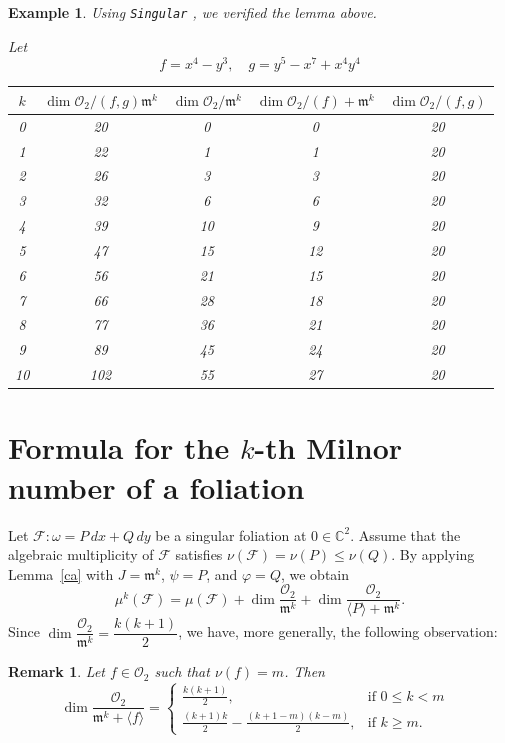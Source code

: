 \documentclass[12pt,letterpaper]{amsart}
\newcommand{\C}{\mathbb{C}}
\newcommand{\F}{\mathcal{F}}
\newcommand{\m}{\mathfrak{m}}
\newtheorem{example}{Example}[section]
\newtheorem{remark}{Remark}[section]
\begin{document}
\begin{example}
Using \texttt{Singular} \cite{Singular}, we verified the lemma above.

Let   
\[
f = x^4 - y^3, \quad g = y^5 - x^7 + x^4y^4
\]

\begin{center}
\renewcommand{\arraystretch}{1.2}
\begin{tabular}{|c|c|c|c|c|}
\toprule
$k$ & $\dim \mathcal{O}_2 / (f,g) \mathfrak{m}^k$ 
& $\dim \mathcal{O}_2 / \mathfrak{m}^k$ 
& $\dim \mathcal{O}_2 / (f)+\mathfrak{m}^k$ 
& $\dim \mathcal{O}_2 / (f,g)$ \\
\midrule
0  & 20  & 0  & 0   & 20 \\
1  & 22  & 1  & 1    & 20 \\
2  & 26  & 3  & 3    & 20 \\
3  & 32  & 6  & 6    & 20 \\
4  & 39  & 10 & 9   & 20 \\
5  & 47  & 15 & 12 & 20 \\
6  & 56  & 21 & 15  & 20 \\
7  & 66  & 28 & 18  & 20 \\
8  & 77  & 36 & 21  & 20 \\
9  & 89  & 45 & 24  & 20 \\
10 & 102 & 55 & 27  & 20 \\
\bottomrule
\end{tabular}
\end{center}
\end{example}


\section{Formula for the $k$-th Milnor number of a foliation}\label{fomula_Milnor}

Let $\F : \omega = P\,dx + Q\,dy$ be a singular foliation at $0 \in \C^2$.  
Assume that the algebraic multiplicity of $\F$ satisfies $\nu(\F) = \nu(P) \leq \nu(Q)$.  
By applying Lemma~\ref{ca} with $J = \m^k$, $\psi = P$, and $\varphi = Q$, we obtain
\begin{equation}\label{eq_apli}
    \mu^{k}(\F)
    = \mu(\F)
    + \dim\frac{\mathcal{O}_2}{\m^{k}}
    + \dim\frac{\mathcal{O}_2}{\langle P\rangle + \m^{k}}.
\end{equation}
Since $\dim\dfrac{\mathcal{O}_2}{\m^{k}} = \dfrac{k(k+1)}{2}$, we have, more generally, the following observation:

\begin{remark}\label{Remark1}
    Let $f\in\mathcal{O}_2$ such that $\nu(f)=m$. Then
    $$
\dim\frac{\mathcal{O}_2}{\mathfrak{m}^{k}+\langle f\rangle}=\begin{cases}
			\frac{k(k+1)}{2}, & \text{if $0\leq k< m$ }\\
            \frac{(k+1)k}{2}-\frac{(k+1-m)(k-m)}{2}, & \text{if $k\geq m$.}
		 \end{cases}
$$
\end{remark}
\end{document}
